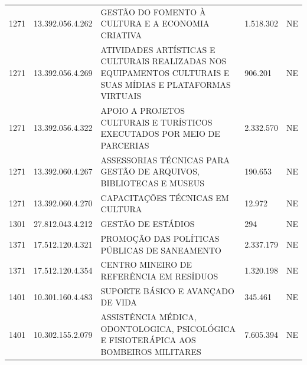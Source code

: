 \documentclass{article}
\begin{document}
\begin{longtable}[c]{m{1cm}|m{2cm}|m{10cm}|m{2cm}|m{1cm}}
\multicolumn{1}{C{1cm}|}{1271} & \multicolumn{1}{C{2cm}|}{13.392.056.4.262} & \multicolumn{1}{L{10cm}|}{GESTÃO DO FOMENTO À CULTURA E A ECONOMIA CRIATIVA} & \multicolumn{1}{R{2cm}|}{1.518.302} & \multicolumn{1}{C{1cm}}{NE} \\
\multicolumn{1}{C{1cm}|}{1271} & \multicolumn{1}{C{2cm}|}{13.392.056.4.269} & \multicolumn{1}{L{10cm}|}{ATIVIDADES ARTÍSTICAS E CULTURAIS REALIZADAS NOS EQUIPAMENTOS CULTURAIS E SUAS MÍDIAS E PLATAFORMAS VIRTUAIS} & \multicolumn{1}{R{2cm}|}{906.201} & \multicolumn{1}{C{1cm}}{NE} \\
\multicolumn{1}{C{1cm}|}{1271} & \multicolumn{1}{C{2cm}|}{13.392.056.4.322} & \multicolumn{1}{L{10cm}|}{APOIO A PROJETOS CULTURAIS E TURÍSTICOS EXECUTADOS POR MEIO DE PARCERIAS} & \multicolumn{1}{R{2cm}|}{2.332.570} & \multicolumn{1}{C{1cm}}{NE} \\
\multicolumn{1}{C{1cm}|}{1271} & \multicolumn{1}{C{2cm}|}{13.392.060.4.267} & \multicolumn{1}{L{10cm}|}{ASSESSORIAS TÉCNICAS PARA GESTÃO DE ARQUIVOS, BIBLIOTECAS E MUSEUS} & \multicolumn{1}{R{2cm}|}{190.653} & \multicolumn{1}{C{1cm}}{NE} \\
\multicolumn{1}{C{1cm}|}{1271} & \multicolumn{1}{C{2cm}|}{13.392.060.4.270} & \multicolumn{1}{L{10cm}|}{CAPACITAÇÕES TÉCNICAS EM CULTURA} & \multicolumn{1}{R{2cm}|}{12.972} & \multicolumn{1}{C{1cm}}{NE} \\
\multicolumn{1}{C{1cm}|}{1301} & \multicolumn{1}{C{2cm}|}{27.812.043.4.212} & \multicolumn{1}{L{10cm}|}{GESTÃO DE ESTÁDIOS} & \multicolumn{1}{R{2cm}|}{294} & \multicolumn{1}{C{1cm}}{NE} \\
\multicolumn{1}{C{1cm}|}{1371} & \multicolumn{1}{C{2cm}|}{17.512.120.4.321} & \multicolumn{1}{L{10cm}|}{PROMOÇÃO DAS POLÍTICAS PÚBLICAS DE SANEAMENTO} & \multicolumn{1}{R{2cm}|}{2.337.179} & \multicolumn{1}{C{1cm}}{NE} \\
\multicolumn{1}{C{1cm}|}{1371} & \multicolumn{1}{C{2cm}|}{17.512.120.4.354} & \multicolumn{1}{L{10cm}|}{CENTRO MINEIRO DE REFERÊNCIA EM RESÍDUOS} & \multicolumn{1}{R{2cm}|}{1.320.198} & \multicolumn{1}{C{1cm}}{NE} \\
\multicolumn{1}{C{1cm}|}{1401} & \multicolumn{1}{C{2cm}|}{10.301.160.4.483} & \multicolumn{1}{L{10cm}|}{SUPORTE BÁSICO E AVANÇADO DE VIDA} & \multicolumn{1}{R{2cm}|}{345.461} & \multicolumn{1}{C{1cm}}{NE} \\
\multicolumn{1}{C{1cm}|}{1401} & \multicolumn{1}{C{2cm}|}{10.302.155.2.079} & \multicolumn{1}{L{10cm}|}{ASSISTÊNCIA MÉDICA, ODONTOLOGICA, PSICOLÓGICA E FISIOTERÁPICA AOS BOMBEIROS MILITARES} & \multicolumn{1}{R{2cm}|}{7.605.394} & \multicolumn{1}{C{1cm}}{NE} \\

\end{longtable}
\end{document}
